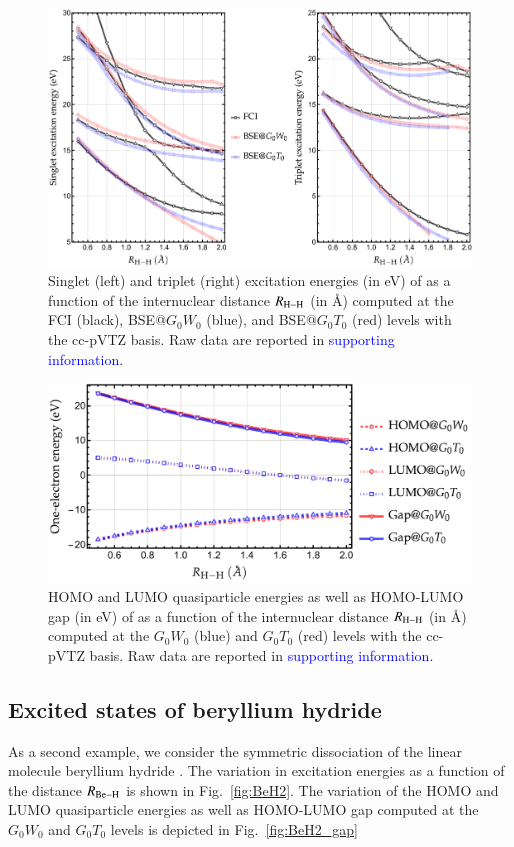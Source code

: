 \documentclass[aip,jcp,reprint,noshowkeys,superscriptaddress]{revtex4-1}
\newcommand{\SupInf}{\textcolor{blue}{supporting information}}
\begin{document}
\begin{figure}
	\includegraphics[width=\textwidth]{H2}
	\caption{Singlet (left) and triplet (right) excitation energies (in \si{\eV}) of  as a function of the internuclear distance $R_{\ce{H-H}}$ (in \si{\angstrom}) computed at the FCI (black), BSE@$G_0W_0$ (blue), and BSE@$G_0T_0$ (red) levels with the cc-pVTZ basis.
	Raw data are reported in {\SupInf}.}
	\label{fig:H2}
\end{figure}

\begin{figure}
	\includegraphics[width=\linewidth]{H2_gap}
	\caption{HOMO and LUMO quasiparticle energies as well as HOMO-LUMO gap (in \si{\eV}) of  as a function of the internuclear distance $R_{\ce{H-H}}$ (in \si{\angstrom}) computed at the $G_0W_0$ (blue) and $G_0T_0$ (red) levels with the cc-pVTZ basis.
	Raw data are reported in {\SupInf}.}
	\label{fig:H2_gap}
\end{figure}

\subsection{Excited states of beryllium hydride}
\label{sec:beh2}
As a second example, we consider the symmetric dissociation of the linear molecule beryllium hydride .
The variation in excitation energies as a function of the distance $R_{\ce{Be-H}}$ is shown in Fig.~\ref{fig:BeH2}.
The variation of the HOMO and LUMO quasiparticle energies as well as HOMO-LUMO gap computed at the $G_0W_0$ and $G_0T_0$ levels is depicted in Fig.~\ref{fig:BeH2_gap}
\end{document}
